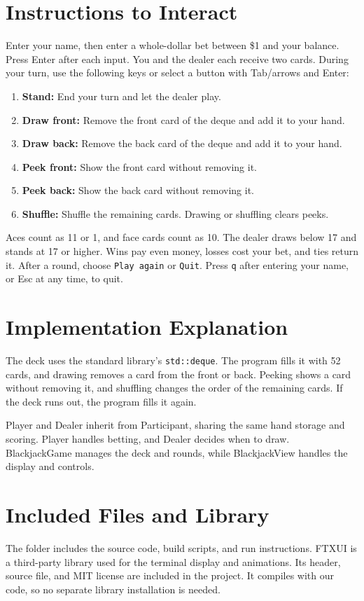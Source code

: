 \documentclass[11pt,letterpaper]{article}
\begin{document}
\section*{Instructions to Interact}
Enter your name, then enter a whole-dollar bet between \$1 and your balance. Press Enter after each input. You and the dealer each receive two cards. During your turn, use the following keys or select a button with Tab/arrows and Enter:
\begin{enumerate}
    \item \textbf{Stand:} End your turn and let the dealer play.
    \item \textbf{Draw front:} Remove the front card of the deque and add it to your hand.
    \item \textbf{Draw back:} Remove the back card of the deque and add it to your hand.
    \item \textbf{Peek front:} Show the front card without removing it.
    \item \textbf{Peek back:} Show the back card without removing it.
    \item \textbf{Shuffle:} Shuffle the remaining cards. Drawing or shuffling clears peeks.
\end{enumerate}
Aces count as 11 or 1, and face cards count as 10. The dealer draws below 17 and stands at 17 or higher. Wins pay even money, losses cost your bet, and ties return it. After a round, choose \texttt{Play again} or \texttt{Quit}. Press \texttt{q} after entering your name, or Esc at any time, to quit.

\newpage
\section*{Implementation Explanation}
The deck uses the standard library's \texttt{std::deque}. The program fills it with 52 cards, and drawing removes a card from the front or back. Peeking shows a card without removing it, and shuffling changes the order of the remaining cards. If the deck runs out, the program fills it again.

Player and Dealer inherit from Participant, sharing the same hand storage and scoring. Player handles betting, and Dealer decides when to draw. BlackjackGame manages the deck and rounds, while BlackjackView handles the display and controls.

\section*{Included Files and Library}
The folder includes the source code, build scripts, and run instructions. FTXUI is a third-party library used for the terminal display and animations. Its header, source file, and MIT license are included in the project. It compiles with our code, so no separate library installation is needed.
\end{document}
